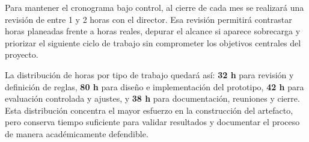 Para mantener el cronograma bajo control, al cierre de cada mes se realizará una revisión de entre 1 y 2 horas con el director. Esa revisión permitirá contrastar horas planeadas frente a horas reales, depurar el alcance si aparece sobrecarga y priorizar el siguiente ciclo de trabajo sin comprometer los objetivos centrales del proyecto.

\noindent
La distribución de horas por tipo de trabajo quedará así: \textbf{32 h} para revisión y definición de reglas, \textbf{80 h} para diseño e implementación del prototipo, \textbf{42 h} para evaluación controlada y ajustes, y \textbf{38 h} para documentación, reuniones y cierre. Esta distribución concentra el mayor esfuerzo en la construcción del artefacto, pero conserva tiempo suficiente para validar resultados y documentar el proceso de manera académicamente defendible.